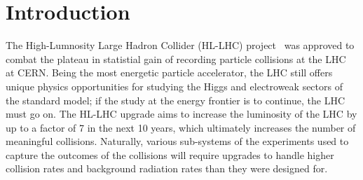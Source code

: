 
\chapter{Introduction}
\label{chap:intro}


The High-Lumnosity Large Hadron Collider (HL-LHC) project~\cite{hl_lhc_tdr} was approved to combat the plateau in statistial gain of recording particle collisions at the LHC~\cite{evans_lhc_2008} at CERN. Being the most energetic particle accelerator, the LHC still offers unique physics opportunities for studying the Higgs and electroweak sectors of the standard model\cite{dainese_physics_2018}; if the study at the energy frontier is to continue, the LHC must go on. The HL-LHC upgrade aims to increase the luminosity of the LHC by up to a factor of 7 in the next 10 years, which ultimately increases the number of meaningful collisions. Naturally, various sub-systems of the experiments used to capture the outcomes of the collisions will require upgrades to handle higher collision rates and background radiation rates than they were designed for. 

